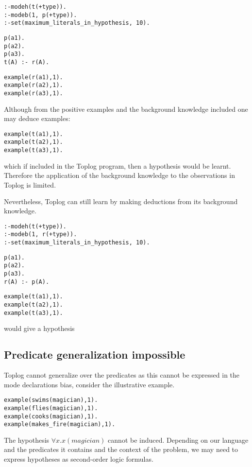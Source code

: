 \begin{lstlisting}
:-modeh(t(+type)).
:-modeb(1, p(+type)).
:-set(maximum_literals_in_hypothesis, 10).
\end{lstlisting}
\begin{minipage}[t]{.40\textwidth}
\begin{lstlisting}
p(a1).
p(a2).
p(a3).
t(A) :- r(A).
\end{lstlisting}
\end{minipage}
\begin{minipage}[t]{.40\textwidth}
\begin{lstlisting}
example(r(a1),1).
example(r(a2),1).
example(r(a3),1).
\end{lstlisting}
\end{minipage}

Although from the positive examples and the background knowledge included one may deduce examples:
\begin{lstlisting}
example(t(a1),1).
example(t(a2),1).
example(t(a3),1).
\end{lstlisting}
which if included in the Toplog program, then a hypothesis
 would be learnt.
Therefore the application of the background knowledge to the observations in Toplog is limited.

Nevertheless, Toplog can still learn by making deductions from its background knowledge.

\begin{lstlisting}
:-modeh(t(+type)).
:-modeb(1, r(+type)).
:-set(maximum_literals_in_hypothesis, 10).
\end{lstlisting}
\begin{minipage}[t]{.35\textwidth}
\begin{lstlisting}
p(a1).
p(a2).
p(a3).
r(A) :- p(A).
\end{lstlisting}
\end{minipage}
\begin{minipage}[t]{.20\textwidth}
\begin{lstlisting}
example(t(a1),1).
example(t(a2),1).
example(t(a3),1).
\end{lstlisting}
\end{minipage}

would give a hypothesis 

\subsection{Predicate generalization impossible}\label{toplog_predicate_generalization_impossible}
Toplog cannot generalize over the predicates as this cannot be expressed in the mode declarations bias, consider the illustrative example.
\begin{lstlisting}
example(swims(magician),1).
example(flies(magician),1).
example(cooks(magician),1).
example(makes_fire(magician),1).
\end{lstlisting}
The hypothesis $\forall x. x(magician)$ cannot be induced. Depending on our language and the predicates it contains and the context of the problem, we may need to express hypotheses as second-order logic formulas.

